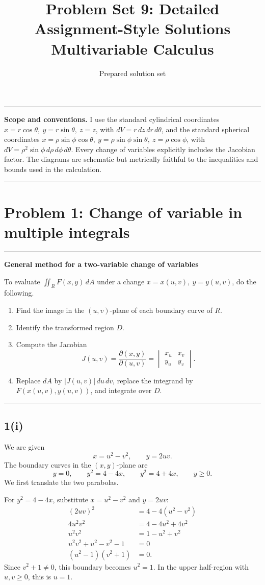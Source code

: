 \documentclass[11pt,a4paper]{article}
\title{\vspace{-1.2cm}\textbf{Problem Set 9: Detailed Assignment-Style Solutions}\\
\large Multivariable Calculus}
\author{Prepared solution set}
\date{}
\newenvironment{methodbox}[1]{\par\medskip\noindent\begin{minipage}{\linewidth}\hrule\smallskip\textbf{#1}\par\smallskip}{\smallskip\hrule\end{minipage}\par\medskip}
\newenvironment{notebox}{\par\medskip\noindent\begin{minipage}{\linewidth}\hrule\smallskip}{\smallskip\hrule\end{minipage}\par\medskip}
\begin{document}
\maketitle
\begin{notebox}
\textbf{Scope and conventions.} I use the standard cylindrical coordinates
\(x=r\cos\theta,\ y=r\sin\theta,\ z=z\), with \(dV=r\,dz\,dr\,d\theta\), and the standard spherical coordinates
\(x=\rho\sin\phi\cos\theta,\ y=\rho\sin\phi\sin\theta,\ z=\rho\cos\phi\), with
\(dV=\rho^2\sin\phi\,d\rho\,d\phi\,d\theta\). Every change of variables explicitly includes the Jacobian factor. The diagrams are schematic but metrically faithful to the inequalities and bounds used in the calculation.
\end{notebox}
\tableofcontents
\newpage

\section{Problem 1: Change of variable in multiple integrals}

\begin{methodbox}{General method for a two-variable change of variables}
To evaluate \(\iint_R F(x,y)\,dA\) under a change \(x=x(u,v),\ y=y(u,v)\), do the following.
\begin{enumerate}[label=\arabic*.]
\item Find the image in the \((u,v)\)-plane of each boundary curve of \(R\).
\item Identify the transformed region \(D\).
\item Compute the Jacobian
\[
J(u,v)=\frac{\partial(x,y)}{\partial(u,v)}
=\begin{vmatrix}x_u&x_v\\y_u&y_v\end{vmatrix}.
\]
\item Replace \(dA\) by \(|J(u,v)|\,du\,dv\), replace the integrand by \(F(x(u,v),y(u,v))\), and integrate over \(D\).
\end{enumerate}
\end{methodbox}

\subsection*{1(i)}
We are given
\[
x=u^2-v^2,\qquad y=2uv.
\]
The boundary curves in the \((x,y)\)-plane are
\[
y=0,\qquad y^2=4-4x,\qquad y^2=4+4x,\qquad y\ge 0.
\]
We first translate the two parabolas.

For \(y^2=4-4x\), substitute \(x=u^2-v^2\) and \(y=2uv\):
\begin{align*}
(2uv)^2&=4-4(u^2-v^2)\\
4u^2v^2&=4-4u^2+4v^2\\
u^2v^2&=1-u^2+v^2\\
u^2v^2+u^2-v^2-1&=0\\
(u^2-1)(v^2+1)&=0.
\end{align*}
Since \(v^2+1\ne 0\), this boundary becomes \(u^2=1\). In the upper half-region with \(u,v\ge 0\), this is \(u=1\).
\end{document}
